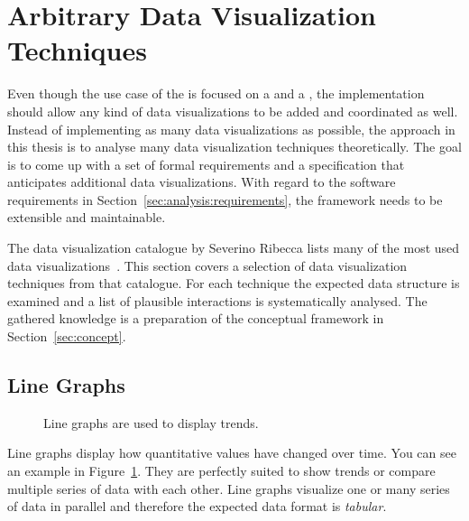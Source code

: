 \section{Arbitrary Data Visualization Techniques}\label{sec:analysis:examples}

Even though the use case of the \cmv{} is focused on a \tmap{} and a \gv{}, the implementation should allow any kind of data visualizations to be added and coordinated as well.
Instead of implementing as many data visualizations as possible, the approach in this thesis is to analyse many data visualization techniques theoretically.
The goal is to come up with a set of formal requirements and a specification that anticipates additional data visualizations.
With regard to the software requirements in Section~\ref{sec:analysis:requirements}, the \cmv{} framework needs to be extensible and maintainable.

The data visualization catalogue by Severino Ribecca lists many of the most used data visualizations~\parencite{VisualizationCatalogue2017}.
This section covers a selection of data visualization techniques from that catalogue.
For each technique the expected data structure is examined and a list of plausible interactions is systematically analysed.
The gathered knowledge is a preparation of the conceptual framework in Section~\ref{sec:concept}.

\subsection{Line Graphs}
\begin{figure}
  \begin{center}
    \qquad
  \caption{Line graphs are used to display trends.}
  \label{fig:analysis:line-graphs}
  \end{center}
\end{figure}

Line graphs display how quantitative values have changed over time.
You can see an example in Figure~\ref{fig:analysis:line-graphs}.
They are perfectly suited to show trends or compare multiple series of data with each other.
Line graphs visualize one or many series of data in parallel and therefore the expected data format is \emph{tabular}.


